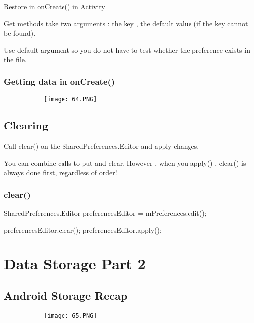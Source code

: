 \documentclass{article}
\begin{document}
Restore in onCreate() in Activity

Get methods take two arguments : the key , the default value (if the key cannot be found).

Use default argument so you do not have to test whether the preference exists in the file.

\subsubsection{Getting data in onCreate()}

      \begin{figure}[ht!]
  \centering
  \begin{subfigure}[b]{0.8\linewidth}
  \texttt{[image: 64.PNG]}
  \end{subfigure}
  \end{figure}

  \subsection{Clearing}

  Call clear() on the SharedPreferences.Editor and apply changes.

  You can combine calls to put and clear. However , when you apply() , clear() is always done first, regardless of order!

  \subsubsection{clear()}

  SharedPreferences.Editor preferencesEditor = mPreferences.edit();

  preferencesEditor.clear();
  preferencesEditor.apply();


  \section{Data Storage Part 2}

  \subsection{Android Storage Recap}

        \begin{figure}[ht!]
  \centering
  \begin{subfigure}[b]{1\linewidth}
  \texttt{[image: 65.PNG]}
  \end{subfigure}
  \end{figure}
\end{document}
